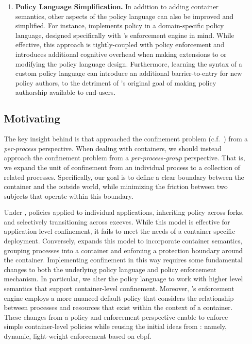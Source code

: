 \begin{enumerate}
  \item \textbf{Policy Language Simplification.}
    In addition to adding container semantics, other aspects of the \bpfbox{} policy
    language can also be improved and simplified. For instance, \bpfbox{} implements
    policy in a domain-specific policy language, designed specifically with \bpfbox{}'s
    enforcement engine in mind. While effective, this approach is tightly-coupled with
    policy enforcement and introduces additional cognitive overhead when making extensions
    to or modifying the policy language design. Furthermore, learning the syntax of
    a custom policy language can introduce an additional barrier-to-entry for new policy
    authors, to the detriment of \bpfbox{}'s original goal of making policy authorship
    available to end-users.
\end{enumerate}

\subsection{Motivating \bpfcontain{}}

The key insight behind \bpfcontain{} is that \bpfbox{} approached the confinement problem
(c.f.~) from a \textit{per-process} perspective. When dealing
with containers, we should instead approach the confinement problem from
a \textit{per-process-group} perspective. That is, we expand the unit of confinement from
an individual process to a collection of related processes. Specifically, our goal is to
define a clear boundary between the container and the outside world, while minimizing the
friction between two subjects that operate within this boundary.

Under \bpfbox{}, policies applied to individual applications, inheriting policy across
forks, and selectively transitioning across execves. While this model is effective for
application-level confinement, it fails to meet the needs of a container-specific
deployment.  Conversely, \bpfcontain{} expands this model to incorporate container
semantics, grouping processes into a container and enforcing a protection boundary around
the container.  Implementing confinement in this way requires some fundamental changes to
both the underlying policy language and policy enforcement mechanism. In particular, we
alter the policy language to work with higher level semantics that support container-level
confinement. Moreover, \bpfcontain{}'s enforcement engine employs a more nuanced default
policy that considers the relationship between processes and resources that exist within
the context of a container. These changes from a policy and enforcement perspective enable
\bpfcontain{} to enforce simple container-level policies while reusing the initial ideas
from \bpfbox{}: namely, dynamic, light-weight enforcement based on \gls{ebpf}.

